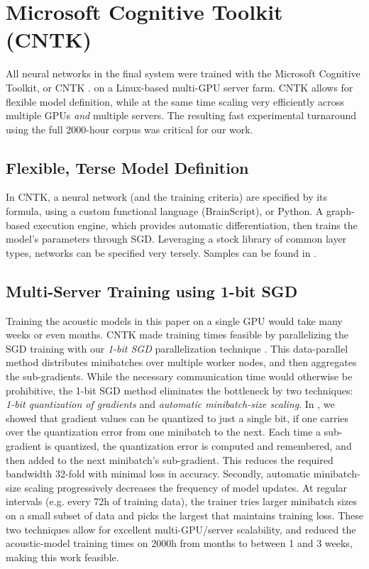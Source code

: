\documentclass{article}
\begin{document}
\section{Microsoft Cognitive Toolkit (CNTK)}
\label{sec:cntk}
All neural networks in the final system were trained with the
Microsoft Cognitive Toolkit, or CNTK \cite{cntkai,CNTK}.
on a Linux-based multi-GPU server farm.
CNTK allows for flexible model definition, while at the same
time scaling very efficiently
across multiple GPUs {\em and} multiple servers.
The resulting fast experimental turnaround
using the full 2000-hour corpus was critical for our work.
\subsection{Flexible, Terse Model Definition}
In CNTK, a neural network (and the training criteria) are specified by
its formula, using a custom functional language (BrainScript), or Python.
A graph-based execution engine, which provides automatic differentiation, then trains the model's parameters through SGD.
Leveraging a stock library of common layer types, networks can be specified
very tersely.
Samples can be found in \cite{cntkai}.
\subsection{Multi-Server Training using 1-bit SGD}
Training the acoustic models in this paper on a single GPU would take many weeks or even months.
CNTK made training times feasible by parallelizing the SGD training with our {\em 1-bit SGD}
parallelization technique \cite{seide20141}. This data-parallel method distributes minibatches over multiple worker nodes, and then aggregates the sub-gradients.
While the necessary communication time would otherwise be prohibitive,
the 1-bit SGD method eliminates the bottleneck by two techniques: {\em 1-bit quantization of gradients} and {\em automatic minibatch-size scaling}.
In \cite{seide20141}, we showed that gradient values can be quantized to just a single bit, if one carries over the quantization error from one minibatch to the next. Each time a sub-gradient is quantized, the quantization error is computed and remembered, and then added to the next minibatch's sub-gradient. This reduces the required bandwidth 32-fold with minimal loss in accuracy.
Secondly, automatic minibatch-size scaling progressively decreases the frequency of model updates. At regular intervals (e.g. every 72h of training data), the trainer tries larger minibatch sizes on a small subset of data and picks the largest that maintains training loss.
These two techniques allow for excellent multi-GPU/server scalability,
and reduced the acoustic-model training times on 2000h from months to between 1 and 3 weeks,
making this work feasible.
\end{document}
